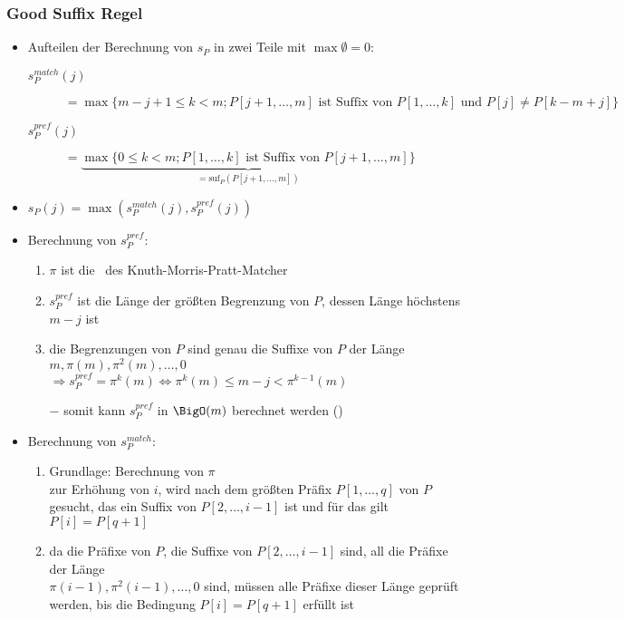\subsubsection*{Good Suffix Regel}
\begin{itemize}[itemsep=-2pt]
	\item Aufteilen der Berechnung von $s_P$ in zwei Teile mit $\max\emptyset=0$:
		\begin{description}
			\item[$s_P^{match}(j)$] $= \max\{m-j+1\leq k<m;P[j+1,\dots,m]\text{ ist Suffix von }P[1,\dots,k]\text{ und }P[j]\neq P[k-m+j]\}$
			\item[$s_P^{pref}(j)$] $=\underbrace{\max\{0\leq k<m;P[1,\dots,k]\text{ ist Suffix von } P[j+1,\dots,m]\}}_{=\text{suf}_P(P[j+1,\dots,m])}$
		\end{description}
	\item $s_P(j)=\max(s_P^{match}(j),s_P^{pref}(j))$
	\item Berechnung von $s_P^{pref}$:
		\begin{enumerate}
			\item $\pi$ ist die \bound~des Knuth-Morris-Pratt-Matcher
			\item $s_P^{pref}$ ist die Länge der größten Begrenzung von $P$, dessen Länge höchstens $m-j$ ist
			\item die Begrenzungen von $P$ sind genau die Suffixe von $P$ der Länge $m,\pi(m),\pi^2(m),\dots,0$\\
			$\Rightarrow s_P^{pref}=\pi^k(m) \Longleftrightarrow\pi^k(m)\leq m-j<\pi^{k-1}(m)$\\\up
			
		\vspace*{-0.5\baselineskip}\item[$-$] somit kann $s_P^{pref}$ in $\BigO(m)$ berechnet werden ()%
		\end{enumerate}
	\item Berechnung von $s_P^{match}$:
		\begin{enumerate}
			\item Grundlage: Berechnung von $\pi$\\
				zur Erhöhung von $i$, wird nach dem größten Präfix $P[1,\dots,q]$ von $P$ gesucht, das ein Suffix von $P[2,\dots,i-1]$ ist und für das gilt $P[i]=P[q+1]$
			\item da die Präfixe von $P$, die Suffixe von $P[2,\dots,i-1]$ sind, all die Präfixe der Länge\\
				$\pi(i-1),\pi^2(i-1),\dots,0$ sind, müssen alle Präfixe dieser Länge geprüft werden, bis die Bedingung $P[i]=P[q+1]$ erfüllt ist\\\up

\end{enumerate}
\end{itemize}
